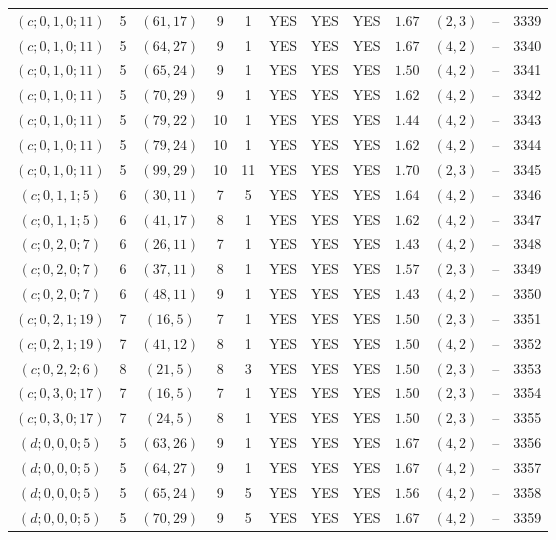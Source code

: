 \begin{longtable}{|c|c|c|c|c|c|c|c|c|c|c|c|}
$(c;0,1,0;11)$ & 5 & $(61,17)$ & 9 & 1 & YES & YES & YES & $1.67$ & $(2,3)$ & -- & 3339\\
$(c;0,1,0;11)$ & 5 & $(64,27)$ & 9 & 1 & YES & YES & YES & $1.67$ & $(4,2)$ & -- & 3340\\
$(c;0,1,0;11)$ & 5 & $(65,24)$ & 9 & 1 & YES & YES & YES & $1.50$ & $(4,2)$ & -- & 3341\\
$(c;0,1,0;11)$ & 5 & $(70,29)$ & 9 & 1 & YES & YES & YES & $1.62$ & $(4,2)$ & -- & 3342\\
$(c;0,1,0;11)$ & 5 & $(79,22)$ & 10 & 1 & YES & YES & YES & $1.44$ & $(4,2)$ & -- & 3343\\
$(c;0,1,0;11)$ & 5 & $(79,24)$ & 10 & 1 & YES & YES & YES & $1.62$ & $(4,2)$ & -- & 3344\\
$(c;0,1,0;11)$ & 5 & $(99,29)$ & 10 & 11 & YES & YES & YES & $1.70$ & $(2,3)$ & -- & 3345\\
$(c;0,1,1;5)$ & 6 & $(30,11)$ & 7 & 5 & YES & YES & YES & $1.64$ & $(4,2)$ & -- & 3346\\
$(c;0,1,1;5)$ & 6 & $(41,17)$ & 8 & 1 & YES & YES & YES & $1.62$ & $(4,2)$ & -- & 3347\\
$(c;0,2,0;7)$ & 6 & $(26,11)$ & 7 & 1 & YES & YES & YES & $1.43$ & $(4,2)$ & -- & 3348\\
$(c;0,2,0;7)$ & 6 & $(37,11)$ & 8 & 1 & YES & YES & YES & $1.57$ & $(2,3)$ & -- & 3349\\
$(c;0,2,0;7)$ & 6 & $(48,11)$ & 9 & 1 & YES & YES & YES & $1.43$ & $(4,2)$ & -- & 3350\\
$(c;0,2,1;19)$ & 7 & $(16,5)$ & 7 & 1 & YES & YES & YES & $1.50$ & $(2,3)$ & -- & 3351\\
$(c;0,2,1;19)$ & 7 & $(41,12)$ & 8 & 1 & YES & YES & YES & $1.50$ & $(4,2)$ & -- & 3352\\
$(c;0,2,2;6)$ & 8 & $(21,5)$ & 8 & 3 & YES & YES & YES & $1.50$ & $(2,3)$ & -- & 3353\\
$(c;0,3,0;17)$ & 7 & $(16,5)$ & 7 & 1 & YES & YES & YES & $1.50$ & $(2,3)$ & -- & 3354\\
$(c;0,3,0;17)$ & 7 & $(24,5)$ & 8 & 1 & YES & YES & YES & $1.50$ & $(2,3)$ & -- & 3355\\
$(d;0,0,0;5)$ & 5 & $(63,26)$ & 9 & 1 & YES & YES & YES & $1.67$ & $(4,2)$ & -- & 3356\\
$(d;0,0,0;5)$ & 5 & $(64,27)$ & 9 & 1 & YES & YES & YES & $1.67$ & $(4,2)$ & -- & 3357\\
$(d;0,0,0;5)$ & 5 & $(65,24)$ & 9 & 5 & YES & YES & YES & $1.56$ & $(4,2)$ & -- & 3358\\
$(d;0,0,0;5)$ & 5 & $(70,29)$ & 9 & 5 & YES & YES & YES & $1.67$ & $(4,2)$ & -- & 3359\\

\end{longtable}
